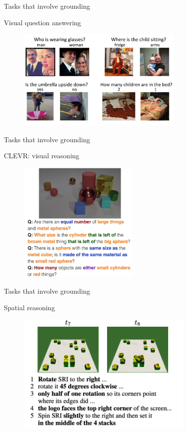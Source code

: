\documentclass[usenames,dvipsnames,notes]{beamer}
\begin{document}
\begin{frame}
    {Tasks that involve grounding}

    Visual question answering \mycite{[Agrawal+ 2015]}
    \vspace{-1em}
    \begin{figure}
        \includegraphics[height=5cm]{figures/vqa}
    \end{figure}
\end{frame}

\begin{frame}
    {Tasks that involve grounding}

    CLEVR: visual reasoning \mycite{[Johnson+ 2015]}
    \vspace{-1em}
    \begin{figure}
        \includegraphics[height=6cm]{figures/clevr}
    \end{figure}
\end{frame}

\begin{frame}
    {Tasks that involve grounding}

    Spatial reasoning \mycite{[Bisk+ 2017]}
    \vspace{-1em}
    \begin{figure}
        \includegraphics[height=6cm]{figures/spatial}
    \end{figure}
\end{frame}
\end{document}
